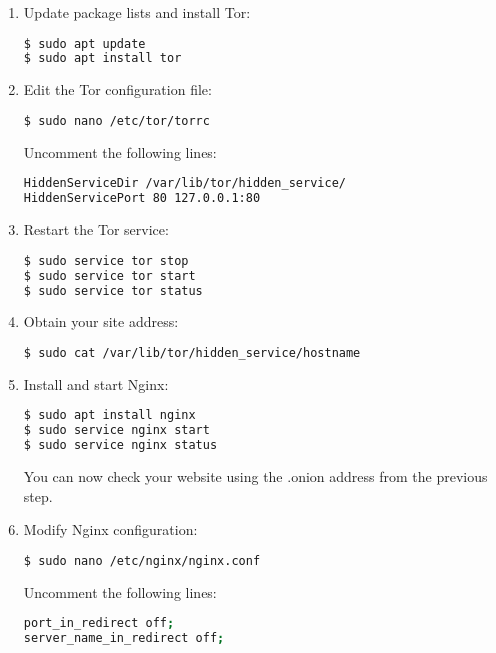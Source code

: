 \begin{enumerate}
\item Update package lists and install Tor:
\begin{lstlisting}[language=bash, breaklines=true, breakatwhitespace=true, columns=fullflexible]
$ sudo apt update
$ sudo apt install tor
\end{lstlisting}

\item Edit the Tor configuration file:
\begin{lstlisting}[language=bash, breaklines=true, breakatwhitespace=true, columns=fullflexible]
$ sudo nano /etc/tor/torrc
\end{lstlisting}
Uncomment the following lines:
\begin{lstlisting}[language=bash, breaklines=true, breakatwhitespace=true, columns=fullflexible]
HiddenServiceDir /var/lib/tor/hidden_service/
HiddenServicePort 80 127.0.0.1:80
\end{lstlisting}

\item Restart the Tor service:
\begin{lstlisting}[language=bash, breaklines=true, breakatwhitespace=true, columns=fullflexible]
$ sudo service tor stop
$ sudo service tor start
$ sudo service tor status
\end{lstlisting}

\item Obtain your site address:
\begin{lstlisting}[language=bash, breaklines=true, breakatwhitespace=true, columns=fullflexible]
$ sudo cat /var/lib/tor/hidden_service/hostname
\end{lstlisting}

\item Install and start Nginx:
\begin{lstlisting}[language=bash, breaklines=true, breakatwhitespace=true, columns=fullflexible]
$ sudo apt install nginx
$ sudo service nginx start
$ sudo service nginx status
\end{lstlisting}
You can now check your website using the .onion address from the previous step.

\item Modify Nginx configuration:
\begin{lstlisting}[language=bash, breaklines=true, breakatwhitespace=true, columns=fullflexible]
$ sudo nano /etc/nginx/nginx.conf
\end{lstlisting}
Uncomment the following lines:
\begin{lstlisting}[language=bash, breaklines=true, breakatwhitespace=true, columns=fullflexible]
port_in_redirect off;
server_name_in_redirect off;
\end{lstlisting}


\end{enumerate}
